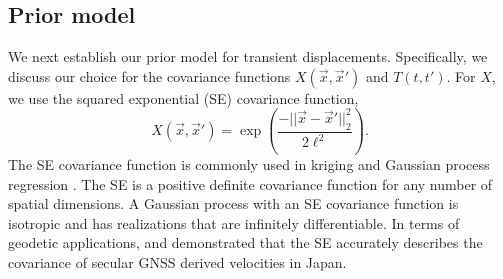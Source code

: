 \documentclass[extra,mreferee]{gji}
\begin{document}
\subsection{Prior model}\label{sec:SignalModel}
We next establish our prior model for transient displacements. Specifically, we discuss our choice for the covariance functions $X(\vec{x},\vec{x}')$ and $T(t,t')$. For $X$, we use the squared exponential (SE) covariance function,
\begin{equation}\label{eq:SE}
X(\vec{x},\vec{x}') = \exp\left(\frac{-||\vec{x} - \vec{x}'||_2^2}{2 \ell^2}\right).
\end{equation}
The SE covariance function is commonly used in kriging \citep[e.g,][]{Cressie1992} and Gaussian process regression \citep[e.g.,][]{Rasmussen2006}. The SE is a positive definite covariance function for any number of spatial dimensions. A Gaussian process with an SE covariance function is isotropic and has realizations that are infinitely differentiable. In terms of geodetic applications, \citet{Kato1998} and \cite{El-Fiky1999} demonstrated that the SE accurately describes the covariance of secular GNSS derived velocities in Japan.     
\end{document}
